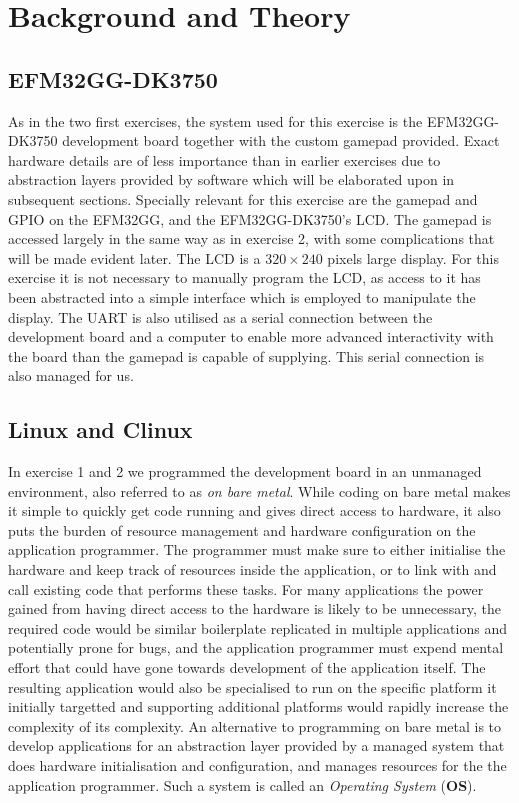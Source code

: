 \chapter{Background and Theory}

\section{EFM32GG-DK3750}

As in the two first exercises, the system used for this exercise is the
EFM32GG-DK3750 development board together with the custom gamepad provided.
Exact hardware details are of less importance than in earlier exercises due to
abstraction layers provided by software which will be elaborated upon in
subsequent sections. Specially relevant for this exercise are the gamepad and
GPIO on the EFM32GG, and the EFM32GG-DK3750's LCD. The gamepad is accessed
largely in the same way as in exercise 2, with some complications that will be
made evident later. The LCD is a \(320 \times 240\) pixels large display. For
this exercise it is not necessary to manually program the LCD, as access to it
has been abstracted into a simple interface which is employed to manipulate the
display. The UART is also utilised as a serial connection between the
development board and a computer to enable more advanced interactivity with the
board than the gamepad is capable of supplying. This serial connection is also
managed for us.

\section{Linux and \textmu Clinux}

In exercise 1 and 2 we programmed the development board in an unmanaged
environment, also referred to as \emph{on bare metal}. While coding on bare
metal makes it simple to quickly get code running and gives direct access to
hardware, it also puts the burden of resource management and hardware
configuration on the application programmer. The programmer must make sure to
either initialise the hardware and keep track of resources inside the
application, or to link with and call existing code that performs these tasks.
For many applications the power gained from having direct access to the hardware
is likely to be unnecessary, the required code would be similar boilerplate
replicated in multiple applications and potentially prone for bugs, and the
application programmer must expend mental effort that could have gone towards
development of the application itself. The resulting application would also be
specialised to run on the specific platform it initially targetted and
supporting additional platforms would rapidly increase the complexity of its
complexity. An alternative to programming on bare metal is to develop
applications for an abstraction layer provided by a managed system that does
hardware initialisation and configuration, and manages resources for the the
application programmer. Such a system is called an \emph{Operating System}
(\textbf{OS}).

